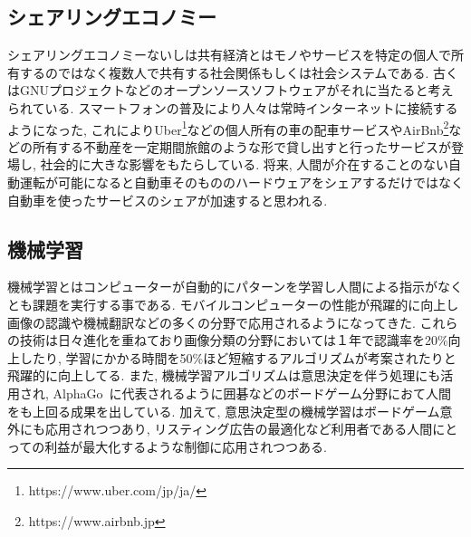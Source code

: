 \subsection{シェアリングエコノミー}

シェアリングエコノミー\cite{Sharing}ないしは共有経済とはモノやサービスを特定の個人で所有するのではなく複数人で共有する社会関係もしくは社会システムである.
古くはGNUプロジェクトなどのオープンソースソフトウェアがそれに当たると考えられている.
スマートフォンの普及により人々は常時インターネットに接続するようになった, これによりUber\footnote[1]{https://www.uber.com/jp/ja/}などの個人所有の車の配車サービスやAirBnb\footnote[2]{https://www.airbnb.jp}などの所有する不動産を一定期間旅館のような形で貸し出すと行ったサービスが登場し,
社会的に大きな影響をもたらしている.
将来, 人間が介在することのない自動運転が可能になると自動車そのもののハードウェアをシェアするだけではなく自動車を使ったサービスのシェアが加速すると思われる.


\subsection{機械学習}

機械学習とはコンピューターが自動的にパターンを学習し人間による指示がなくとも課題を実行する事である.
モバイルコンピューターの性能が飛躍的に向上し画像の認識や機械翻訳などの多くの分野で応用されるようになってきた.
これらの技術は日々進化を重ねており画像分類の分野においては１年で認識率を20\%向上したり, 学習にかかる時間を50\%ほど短縮するアルゴリズムが考案されたりと飛躍的に向上してる.
また, 機械学習アルゴリズムは意思決定を伴う処理にも活用され, AlphaGo~\cite{AlphaGo}に代表されるように囲碁などのボードゲーム分野におて人間をも上回る成果を出している.
加えて, 意思決定型の機械学習はボードゲーム意外にも応用されつつあり, リスティング広告の最適化など利用者である人間にとっての利益が最大化するような制御に応用されつつある.


